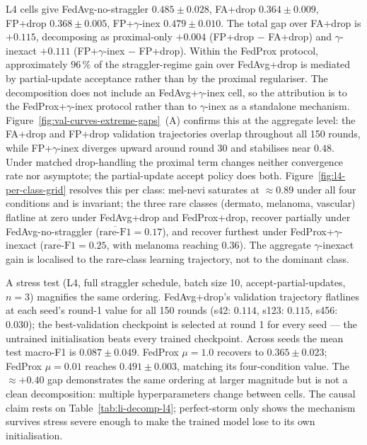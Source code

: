 \documentclass[11pt,a4paper]{report}
\begin{document}
L4 cells give FedAvg-no-straggler $0.485 \pm 0.028$, FA+drop
$0.364 \pm 0.009$, FP+drop $0.368 \pm 0.005$, FP+$\gamma$-inex
$0.479 \pm 0.010$. The total gap over FA+drop is $+0.115$, decomposing as
proximal-only $+0.004$ (FP+drop $-$ FA+drop) and $\gamma$-inexact $+0.111$
(FP+$\gamma$-inex $-$ FP+drop). Within the FedProx protocol, approximately
$96\,\%$ of the straggler-regime gain over FedAvg+drop is mediated by
partial-update acceptance rather than by the proximal regulariser. The
decomposition does not include an FedAvg+$\gamma$-inex cell, so the
attribution is to the FedProx+$\gamma$-inex protocol rather than to
$\gamma$-inex as a standalone mechanism.
Figure~\ref{fig:val-curves-extreme-gaps}~(A) confirms this at the aggregate
level: the FA+drop and FP+drop validation trajectories overlap throughout all
150 rounds, while FP+$\gamma$-inex diverges upward around round 30 and
stabilises near $0.48$. Under matched drop-handling the proximal term
changes neither convergence rate nor asymptote; the partial-update accept
policy does both. Figure~\ref{fig:l4-per-class-grid} resolves this per
class: mel-nevi saturates at $\approx 0.89$ under all four conditions and is
invariant; the three rare classes (dermato, melanoma, vascular) flatline at
zero under FedAvg+drop and FedProx+drop, recover partially under
FedAvg-no-straggler ($\overline{\text{rare-F1}} = 0.17$), and recover
furthest under FedProx+$\gamma$-inexact
($\overline{\text{rare-F1}} = 0.25$, with melanoma reaching $0.36$). The
aggregate $\gamma$-inexact gain is localised to the rare-class learning
trajectory, not to the dominant class.

A stress test (L4, full straggler schedule, batch size 10,
accept-partial-updates, $n=3$) magnifies the same ordering. FedAvg+drop's
validation trajectory flatlines at each seed's round-1 value for all 150
rounds (s42: $0.114$, s123: $0.115$, s456: $0.030$); the best-validation
checkpoint is selected at round 1 for every seed --- the untrained
initialisation beats every trained checkpoint. Across seeds the mean test
macro-F1 is $0.087 \pm 0.049$. FedProx $\mu = 1.0$ recovers to $0.365 \pm 0.023$;
FedProx $\mu = 0.01$ reaches $0.491 \pm 0.003$, matching its four-condition
value. The $\approx +0.40$ gap demonstrates the same ordering at larger
magnitude but is not a clean decomposition: multiple hyperparameters change
between cells. The causal claim rests on Table~\ref{tab:li-decomp-l4};
perfect-storm only shows the mechanism survives stress severe enough to
make the trained model lose to its own initialisation.
\end{document}
